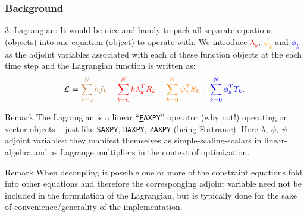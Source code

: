 \documentclass{beamer}
\begin{document}
\begin{frame}[shrink] \frametitle{Background}
    \tiny{
  \begin{center}



  \begin{block}{3. Lagrangian:}
    It would be nice and handy to pack all separate equations (objects)
    into one equation (object) to operate with. We introduce
    \textcolor{red}{$\lambda_k$}, \textcolor{orange}{$\psi_k$} and
    \textcolor{blue}{$\phi_k$} as the adjoint variables associated with
    each of these function objects at the each time step and the
    Lagrangian function is written as:
    \begin{equation}\label{eqn:nbg-lagrangian}
      {\cal{L}} = \textcolor{brown}{\sum_{k=0}^N h f_k} + \textcolor{red}{ \sum_{k=0}^N h \lambda_k^T R_k} 
      +  \textcolor{orange}{ \sum_{k=0}^N\psi_k^T S_k} +  \textcolor{blue}{ \sum_{k=0}^N\phi_k^T T_k}.
    \end{equation}
  \end{block}
  \begin{block}{Remark}
    The Lagrangian is a linear ``\texttt{\underline{F}AXPY}'' 
    operator  (why not!) operating on vector objects -- just like \texttt{\underline{S}AXPY}, 
    \texttt{\underline{D}AXPY}, \texttt{\underline{Z}AXPY} (being Fortranic).
    Here $\lambda,~\phi,~\psi$ adjoint variables: they
    manifest themselves as simple-scaling-scalars in linear-algebra and
    as Lagrange multipliers in the context of optimization.
  \end{block}
  \begin{block}{Remark}
    When decoupling is possible one or more of the
    constraint equations fold into other equations and therefore the
    corresponging adjoint variable need not be included in the
    formulation of the Lagrangian, but is typically done for the sake of
    convenience/generality of the implementation.
  \end{block}
  \end{center}
  }
\end{frame}
\end{document}
